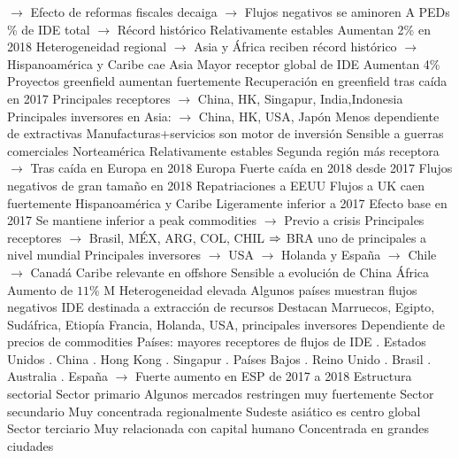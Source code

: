 \documentclass{nuevotema}
\begin{document}
\begin{esquemal}
				\4[] $\to$ Efecto de reformas fiscales decaiga
				\4[] $\to$ Flujos negativos se aminoren
				\4 A PEDs
				\% de IDE total
				\4[] $\to$ Récord histórico
				\4[] Relativamente estables
				\4[] Aumentan 2\% en 2018
				\4[] Heterogeneidad regional
				\4[] $\to$ Asia y África reciben récord histórico
				\4[] $\to$ Hispanoamérica y Caribe cae
				\4 Asia
				\4[] Mayor receptor global de IDE
				\4[] Aumentan 4\%
				\4[] Proyectos greenfield aumentan fuertemente
				\4[] Recuperación en greenfield tras caída en 2017
				\4[] Principales receptores
				\4[] $\to$ China, HK, Singapur, India,Indonesia
				\4[] Principales inversores en Asia:
				\4[] $\to$ China, HK, USA, Japón
				\4[] Menos dependiente de extractivas
				\4[] Manufacturas+servicios son motor de inversión
				\4[] Sensible a guerras comerciales
				\4 Norteamérica
				\4[] Relativamente estables
				\4[] Segunda región más receptora
				\4[] $\to$ Tras caída en Europa en 2018
				\4 Europa
				\4[] Fuerte caída en 2018 desde 2017
				\4[] Flujos negativos de gran tamaño en 2018
				\4[] Repatriaciones a EEUU
				\4[] Flujos a UK caen fuertemente
				\4 Hispanoamérica y Caribe
				\4[] Ligeramente inferior a 2017
				\4[] Efecto base en 2017
				\4[] Se mantiene inferior a peak commodities
				\4[] $\to$ Previo a crisis
				\4[] Principales receptores
				\4[] $\to$ Brasil, MÉX, ARG, COL, CHIL
				\4[] $\Rightarrow$ BRA uno de principales a nivel mundial
				\4[] Principales inversores
				\4[] $\to$ USA
				\4[] $\to$ Holanda y España
				\4[] $\to$ Chile
				\4[] $\to$ Canadá
				\4[] Caribe relevante en offshore
				\4[] Sensible a evolución de China
				\4 África
				\4[] Aumento de $11\%$
				 M
				\4[] Heterogeneidad elevada
				\4[] Algunos países muestran flujos negativos
				\4[] IDE destinada a extracción de recursos
				\4[] Destacan Marruecos, Egipto, Sudáfrica, Etiopía
				\4[] Francia, Holanda, USA, principales inversores
				\4[] Dependiente de precios de commodities
				\4 Países: mayores receptores de flujos de IDE
				. Estados Unidos
				. China
				. Hong Kong
				. Singapur
				. Países Bajos
				. Reino Unido
				. Brasil
				. Australia
				. España
				\4[] $\to$ Fuerte aumento en ESP de 2017 a 2018
			\3 Estructura sectorial
				\4 Sector primario
				\4[] Algunos mercados restringen muy fuertemente
				\4 Sector secundario
				\4[] Muy concentrada regionalmente
				\4[] Sudeste asiático es centro global
				\4 Sector terciario
				\4[] Muy relacionada con capital humano
				\4[] Concentrada en grandes ciudades

\end{esquemal}
\end{document}
